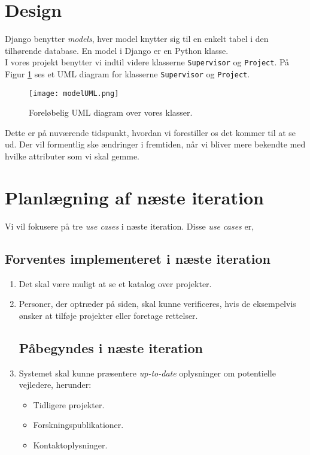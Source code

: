 \documentclass[11pt]{article}
\begin{document}
\section{Design}
Django benytter \textit{models}, hver model knytter sig til en enkelt tabel i den tilhørende database. En model i Django er en Python klasse. \\ I vores projekt benytter vi indtil videre klasserne \texttt{Supervisor} og \texttt{Project}. På Figur \ref{fig:modelUML} ses et UML diagram for klasserne \texttt{Supervisor} og \texttt{Project}.

\begin{figure}[!h] %
			\centering
			\texttt{[image: modelUML.png]}
			\caption{Foreløbelig UML diagram over vores klasser.}
			\label{fig:modelUML}
\end{figure}

Dette er på nuværende tidspunkt, hvordan vi forestiller os det kommer til at se ud. Der vil formentlig ske ændringer i fremtiden, når vi bliver mere bekendte med hvilke attributer som vi skal gemme.

\section{Planlægning af næste iteration}
Vi vil fokusere på tre \textit{use cases} i næste iteration. Disse \textit{use cases} er,
\subsection*{Forventes implementeret i næste iteration}
\begin{enumerate}
	\item \label{enum:katalog} Det skal være muligt at se et katalog over projekter.

	\item \label{enum:verifikation} Personer, der optræder på siden, skal kunne verificeres, hvis de eksempelvis ønsker at tilføje projekter eller foretage rettelser.

\subsection*{Påbegyndes i næste iteration}

	\item \label{enum:vejlederInfo} Systemet skal kunne præsentere \textit{up-to-date} oplysninger om potentielle vejledere, herunder:
	\begin{itemize}
		\item Tidligere projekter.
		\item Forskningspublikationer.
		\item Kontaktoplysninger.
	\end{itemize}
\end{enumerate}
\end{document}
